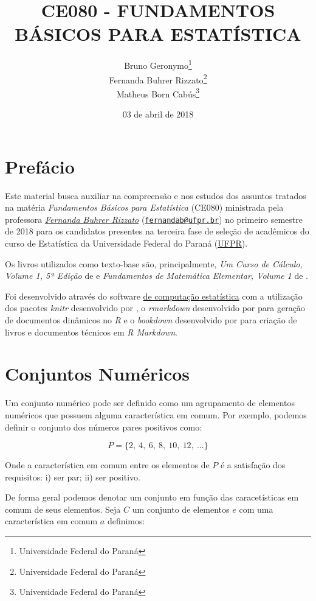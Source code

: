 \documentclass[]{book}
\title{CE080 - FUNDAMENTOS BÁSICOS PARA ESTATÍSTICA}
\author{Bruno Geronymo\footnote{Universidade Federal do Paraná} \\ Fernanda Buhrer Rizzato\footnote{Universidade Federal do Paraná} \\ Matheus Born Cabús\footnote{Universidade Federal do Paraná}}
\date{03 de abril de 2018}
\begin{document}
\maketitle

{
\setcounter{tocdepth}{1}
\tableofcontents
}
\chapter*{Prefácio}\label{prefacio}

Este material busca auxiliar na compreensão e nos estudos dos assuntos
tratados na matéria \emph{Fundamentos Básicos para Estatística} (CE080)
ministrada pela professora
\href{http://leg.ufpr.br/doku.php/pessoais:fernanda}{\emph{Fernanda
Buhrer Rizzato}}
(\href{mailto:fernandab@ufpr.br}{\nolinkurl{fernandab@ufpr.br}}) no
primeiro semestre de 2018 para os candidatos presentes na terceira fase
de seleção de acadêmicos do curso de Estatística da Universidade Federal
do Paraná (\href{http://www.ufpr.br/}{UFPR}).

Os livros utilizados como texto-base são, principalmente, \emph{Um Curso
de Cálculo, Volume 1, 5ª Edição} de \citet{guidorizzi2013curso} e
\emph{Fundamentos de Matemática Elementar, Volume 1} de
\citet{iezzi2004fundamentos}.

Foi desenvolvido através do software
\href{https://www.r-project.org/}{\citet{R-base} de computação
estatística} com a utilização dos pacotes \emph{knitr} desenvolvido por
\citet{R-knitr}, o \emph{rmarkdown} desenvolvido por \citet{R-rmarkdown}
para geração de documentos dinâmicos no \emph{R} e o \emph{bookdown}
desenvolvido por \citet{R-bookdown} para criação de livros e documentos
técnicos em \emph{R Markdown}.

\chapter{Conjuntos Numéricos}\label{conjuntos-numericos}

Um conjunto numérico pode ser definido como um agrupamento de elementos
numéricos que possuem alguma característica em comum. Por exemplo,
podemos definir o conjunto dos números pares positivos como:

\[P = \{ 2,\ 4,\ 6,\ 8,\ 10,\ 12,\ ...\}\]

Onde a característica em comum entre os elementos de \(P\) é a
satisfação dos requisitos: i) ser par; ii) ser positivo.

De forma geral podemos denotar um conjunto em função das caracetísticas
em comum de seus elementos. Seja \(C\) um conjunto de elementos \(e\)
com uma característica em comum \(a\) definimos:
\end{document}
